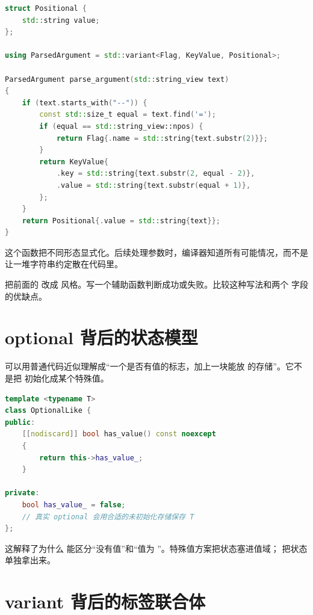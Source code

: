 \begin{lstlisting}[language=C++,caption={参数词汇类型}]
struct Positional {
    std::string value;
};

using ParsedArgument = std::variant<Flag, KeyValue, Positional>;

ParsedArgument parse_argument(std::string_view text)
{
    if (text.starts_with("--")) {
        const std::size_t equal = text.find('=');
        if (equal == std::string_view::npos) {
            return Flag{.name = std::string{text.substr(2)}};
        }
        return KeyValue{
            .key = std::string{text.substr(2, equal - 2)},
            .value = std::string{text.substr(equal + 1)},
        };
    }
    return Positional{.value = std::string{text}};
}
\end{lstlisting}

这个函数把不同形态显式化。后续处理参数时，编译器知道所有可能情况，而不是让一堆字符串约定散在代码里。

\begin{exercisebox}
把前面的  改成  风格。写一个辅助函数判断成功或失败。比较这种写法和两个  字段的优缺点。
\end{exercisebox}

\section{optional 背后的状态模型}

 可以用普通代码近似理解成“一个是否有值的标志，加上一块能放  的存储”。它不是把  初始化成某个特殊值。

\begin{lstlisting}[language=C++,caption={optional 的近似模型}]
template <typename T>
class OptionalLike {
public:
    [[nodiscard]] bool has_value() const noexcept
    {
        return this->has_value_;
    }

private:
    bool has_value_ = false;
    // 真实 optional 会用合适的未初始化存储保存 T
};
\end{lstlisting}

这解释了为什么  能区分“没有值”和“值为 ”。特殊值方案把状态塞进值域； 把状态单独拿出来。

\section{variant 背后的标签联合体}


